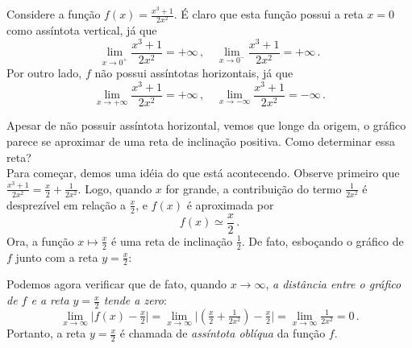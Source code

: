 \begin{ex}\label{ex:assolbbb}
Considere a função $f(x)=\frac{x^3+1}{2 x^2}$. 
É claro que esta função possui a reta $x=0$ como assíntota vertical, já que 
$$
\lim_{x\to 0^+}\frac{x^3+1}{2x^2}=+\infty\,,\quad \lim_{x\to
0^-}\frac{x^3+1}{2x^2}=+\infty\,.
$$
Por outro lado, $f$ não possui assíntotas horizontais, já que 
$$
\lim_{x\to +\infty}\frac{x^3+1}{2x^2}=+\infty\,,\quad \lim_{x\to
-\infty}\frac{x^3+1}{2x^2}=-\infty\,.
$$
\begin{center}
\begin{bmlimage}\end{bmlimage}
\end{center}
Apesar de não possuir assíntota horizontal, vemos que longe da origem, 
o gráfico parece se aproximar de uma reta de inclinação
positiva. Como determinar essa reta?\\

Para começar, demos uma idéia do que está acontecendo. 
Observe primeiro que
$\frac{x^3+1}{2x^2}=
\frac{x}{2}+\frac{1}{2x^2}$. Logo, quando $x$ for grande, a
contribuição 
do termo $\frac{1}{2x^2}$ é desprezível em relação a
$\frac{x}{2}$, e $f(x)$ é aproximada por
$$
f(x)\simeq \frac{x}{2}\,.$$
Ora, a função $x\mapsto \frac{x}{2}$ é uma reta de inclinação $\frac{1}{2}$. De fato,
esboçando o gráfico de $f$ junto com a reta $y=\frac{x}{2}$:

\begin{center}
\begin{bmlimage}\end{bmlimage}
\end{center}
Podemos agora verificar que de fato, 
quando $x\to \infty$, \emph{a distância entre o gráfico
de $f$ e a reta $y=\frac{x}{2}$ tende a zero}:
\begin{equation}\label{eq:biduleolbik}
\lim_{x\to \infty}\bigl|f(x)-\tfrac{x}{2}\bigr|=
\lim_{x\to \infty}\bigl|(\tfrac{x}{2}+\tfrac{1}{2x^2})-\tfrac{x}{2}\bigr|=
\lim_{x\to \infty}\tfrac{1}{2x^2}=0\,.
\end{equation}
Portanto, a reta $y=\frac{x}{2}$ é chamada de \emph{assíntota oblíqua} da função $f$.
\end{ex}

